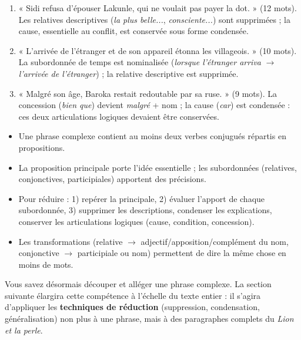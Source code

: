 \documentclass[11pt]{article}
\newcommand{\cle}[1]{{\popxbold\color{popdark}#1}}
\begin{document}
\begin{corrige}
\begin{enumerate}
\item « Sidi refusa d'épouser Lakunle, qui ne voulait pas payer la dot. » (12 mots). Les relatives descriptives (\emph{la plus belle...}, \emph{consciente...}) sont supprimées ; la cause, essentielle au conflit, est conservée sous forme condensée.
\item « L'arrivée de l'étranger et de son appareil étonna les villageois. » (10 mots). La subordonnée de temps est nominalisée (\emph{lorsque l'étranger arriva} $\rightarrow$ \emph{l'arrivée de l'étranger}) ; la relative descriptive est supprimée.
\item « Malgré son âge, Baroka restait redoutable par sa ruse. » (9 mots). La concession (\emph{bien que}) devient \emph{malgré} + nom ; la cause (\emph{car}) est condensée : ces deux articulations logiques devaient être conservées.
\end{enumerate}
\end{corrige}

\begin{aretenir}
\begin{itemize}
\item Une \cle{phrase complexe} contient au moins deux verbes conjugués répartis en propositions.
\item La \cle{proposition principale} porte l'idée essentielle ; les subordonnées (relatives, conjonctives, participiales) apportent des précisions.
\item Pour réduire : 1) repérer la principale, 2) évaluer l'apport de chaque subordonnée, 3) supprimer les descriptions, condenser les explications, conserver les articulations logiques (cause, condition, concession).
\item Les transformations (relative $\rightarrow$ adjectif/apposition/complément du nom, conjonctive $\rightarrow$ participiale ou nom) permettent de dire la même chose en moins de mots.
\end{itemize}
\end{aretenir}

Vous savez désormais découper et alléger une phrase complexe. La section suivante élargira cette compétence à l'échelle du texte entier : il s'agira d'appliquer les \textbf{techniques de réduction} (suppression, condensation, généralisation) non plus à une phrase, mais à des paragraphes complets du \emph{Lion et la perle}.
\end{document}
